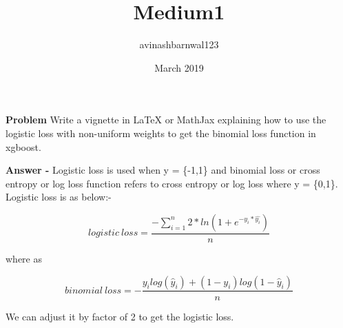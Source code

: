 \documentclass{article}
\title{Medium1}
\author{avinashbarnwal123 }
\date{March 2019}
\begin{document}
\maketitle

\begin{flushleft}

\textbf{Problem} Write a vignette in LaTeX or MathJax explaining how to use the logistic loss with non-uniform weights to get the binomial loss function in xgboost.

\textbf{Answer -} Logistic loss is used when y = \{-1,1\} and binomial loss or cross entropy or log loss function refers to cross entropy or log loss where y = \{0,1\}. Logistic loss is as below:-

\begin{equation}
logistic\ loss = \frac{-\sum_{i=1}^n2*ln(1+e^{-y_i*\hat{y_i}})}{n}   
\end{equation}

where as

\begin{equation}
binomial\ loss = -\frac{y_ilog(\hat{y}_i)+(1-y_i)log(1-\hat{y}_i)}{n}    
\end{equation}

We can adjust it by factor of 2 to get the logistic loss.
\end{flushleft}
\end{document}
